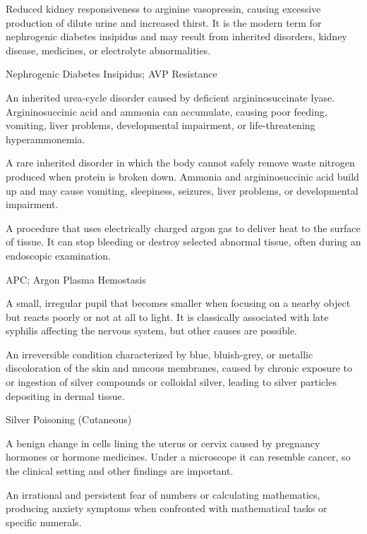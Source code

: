  Reduced kidney responsiveness to arginine vasopressin, causing excessive production of dilute urine and increased thirst. It is the modern term for nephrogenic diabetes insipidus and may result from inherited disorders, kidney disease, medicines, or electrolyte abnormalities.

\synonyms
Nephrogenic Diabetes Insipidus; AVP Resistance

 An inherited urea-cycle disorder caused by deficient argininosuccinate lyase. Argininosuccinic acid and ammonia can accumulate, causing poor feeding, vomiting, liver problems, developmental impairment, or life-threatening hyperammonemia.

 A rare inherited disorder in which the body cannot safely remove waste nitrogen produced when protein is broken down. Ammonia and argininosuccinic acid build up and may cause vomiting, sleepiness, seizures, liver problems, or developmental impairment.

 A procedure that uses electrically charged argon gas to deliver heat to the surface of tissue. It can stop bleeding or destroy selected abnormal tissue, often during an endoscopic examination.

\synonyms
APC; Argon Plasma Hemostasis

 A small, irregular pupil that becomes smaller when focusing on a nearby object but reacts poorly or not at all to light. It is classically associated with late syphilis affecting the nervous system, but other causes are possible.

 An irreversible condition characterized by blue, bluish-grey, or metallic discoloration of the skin and mucous membranes, caused by chronic exposure to or ingestion of silver compounds or colloidal silver, leading to silver particles depositing in dermal tissue.

\synonyms
Silver Poisoning (Cutaneous)

 A benign change in cells lining the uterus or cervix caused by pregnancy hormones or hormone medicines. Under a microscope it can resemble cancer, so the clinical setting and other findings are important.

 An irrational and persistent fear of numbers or calculating mathematics, producing anxiety symptoms when confronted with mathematical tasks or specific numerals.

